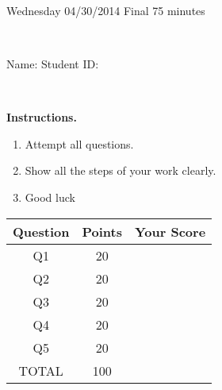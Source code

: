 \documentclass[12pt, oneside]{amsart}
\newcommand{\one}{20}
\newcommand{\two}{20}
\newcommand{\three}{20}
\newcommand{\four}{20}
\newcommand{\five}{20}
\begin{document}
%

\begin{center}
    \hrulefill\\
    {\bf \textsf{\raisebox{-0.10cm}{Spring 2014: MATH 285} \hspace{\fill} 
            \raisebox{-0.10cm}{Introduction to Applied Mathematics} \hspace{\fill}
            \raisebox{-0.10cm}{David Karapetyan}}}\\
    \hrulefill\\
    {\large \rule{0cm}{1.2cm} \textsf{Wednesday 04/30/2014} \hfill
        \textsf{Final} \hfill  \textsf{75 minutes}}\\
    {\large\rule{0cm}{1.2cm}\textsf{Name: \framebox[2.9in]{\rule{0cm}{0.8cm}} 
            \hspace{\fill}
            Student ID:\@\framebox[2.1in]{\rule{0cm}{0.8cm}}}}\\
\end{center}
\vspace{0.8cm}

\noindent
{\bf \textsf{Instructions.}}

\begin{enumerate}
    \item Attempt all questions.   
    \item Show all the steps of your work clearly.  
    \item Good luck 
\end{enumerate}

\vfill


\begin{center}
    {\large
        \begin{tabular}{|c|c|c|}
            \hline
            \rule[-0.3cm]{0cm}{1cm}
            \textsf{Question} & \textsf{Points} &  \textsf{Your Score} \\
            \hline
            \rule[-0.3cm]{0cm}{1cm}
            \textsf{Q1} & \one &\\
            \hline
            \rule[-0.3cm]{0cm}{1cm}
            \textsf{Q2} & \two &\\
            \hline
            \rule[-0.3cm]{0cm}{1cm}
            \textsf{Q3} & \three &\\
            \hline
            \rule[-0.3cm]{0cm}{1cm}
            \textsf{Q4} & \four &\\
            \hline
            \rule[-0.3cm]{0cm}{1cm}
            \textsf{Q5} & \five &\\
            \hline
            \rule[-0.3cm]{0cm}{1cm}

            \textsf{TOTAL} & 100 & \\
            \hline
        \end{tabular}
    } 

\end{center}
\end{document}
